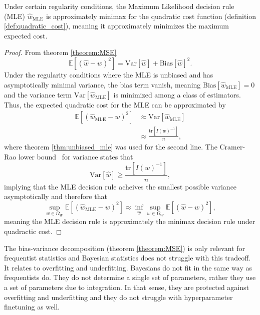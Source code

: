 \begin{corollary}
	\label{cor:MLE_minimax}
	Under certain regularity conditions, the Maximum Likelihood decision rule (MLE) $\hat{w}_{\text{MLE}}$ is approximately minimax for the quadratic cost function (definition \ref{def:quadratic_cost}), meaning it approximately minimizes the maximum expected cost.
	
	\begin{proof}
		From theorem \ref{theorem:MSE}
		\begin{equation}
			\mathbb{E}[(\hat{w}-w)^2] = \text{Var}[\hat{w}]+\text{Bias}[\hat{w}]^2.
		\end{equation}
		Under the regularity conditions where the MLE is unbiased and has asymptotically minimal variance, the bias term vanish, meaning $\text{Bias}[\hat{w}_{\text{MLE}}] = 0$ and the variance term $\text{Var}[\hat{w}_{\text{MLE}}]$ is minimized among a class of estimators. Thus, the expected quadratic cost for the MLE can be approximated by
		\begin{equation}
			\begin{split}
				\mathbb{E}[(\hat{w}_{\text{MLE}}-w)^2] &\approx \text{Var}[\hat{w}_{\text{MLE}}]\\
				&\approx \frac{\text{tr}[I(w)^{-1}]}{n},
			\end{split}
		\end{equation}
		where theorem \ref{thm:unbiased_mle} was used for the second line. The Cramer-Rao lower bound~\citep{Rao1973Linear} for variance states that 
		\begin{equation}
			\text{Var}[\hat{w}]\geq \frac{\text{tr}[I(w)^{-1}]}{n},
		\end{equation}
		implying that the MLE decision rule acheives the smallest possible variance asymptotically and therefore that 
		\begin{equation}
			\sup_{w\in \Omega_W}\mathbb{E}[(\hat{w}_{\text{MLE}}-w)^2]\approx \inf_{\hat{w}} \sup_{w \in \Omega_W} \mathbb{E}[(\hat{w} - w)^2],
		\end{equation}
		meaning the MLE decision rule is approximately the minimax decision rule under quadractic cost.
	\end{proof}
\end{corollary}

\begin{example}
	The bias-variance decomposition (theorem \ref{theorem:MSE}) is only relevant for frequentist statistics and Bayesian statistics does not struggle with this tradeoff. It relates to overfitting and underfitting. Bayesians do not fit in the same way as frequentists do. They do not determine a single set of parameters, rather they use a set of parameters due to integration. In that sense, they are protected against overfitting and underfitting and they do not struggle with hyperparameter finetuning as well.
\end{example}

